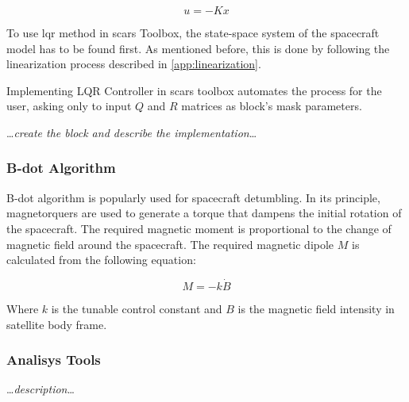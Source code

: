         \begin{equation}
            u = -Kx
        \end{equation}

        To use \ac{lqr} method in \ac{scars} Toolbox, the state-space system of the spacecraft model has to be found first. As mentioned before, this is done by following the linearization process described in \autoref{app:linearization}.

        Implementing LQR Controller in \ac{scars} toolbox automates the process for the user, asking only to input $Q$ and $R$ matrices as block's mask parameters.

        \dots\textit{create the block and describe the implementation}\dots

    \subsubsection{B-dot Algorithm}
        B-dot algorithm is popularly used for spacecraft detumbling. In its principle, magnetorquers are used to generate a torque that dampens the initial rotation of the spacecraft. The required magnetic moment is proportional to the change of magnetic field around the spacecraft. The required magnetic dipole $M$ is calculated from the following equation:

        \begin{equation}
            M = -k\dot{B}
        \end{equation} \cite{capo2014b}

        Where $k$ is the tunable control constant and $B$ is the magnetic field intensity in satellite body frame.

    
    \subsubsection{Analisys Tools}
        \dots\textit{description}\dots
